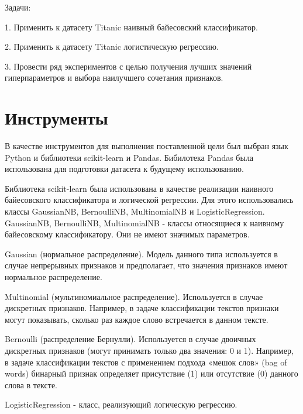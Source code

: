 \documentclass[a4paper,12pt]{article}
\begin{document}
	\vspace{0.5cm}
	Задачи: 
	
	\vspace{0.5cm}
	1. Применить к датасету Titanic наивный байесовский классификатор.
	
	\vspace{0.5cm}
	2. Применить к датасету Titanic логистическую регрессию.

	\vspace{0.5cm}
	3. Провести ряд экспериментов с целью получения лучших значений гиперпараметров и выбора наилучшего сочетания признаков.
	
\newpage\section{Инструменты} 
	В качестве инструментов для выполнения поставленной цели был выбран язык Python и библиотеки scikit-learn и Pandas.
	Бибилотека Pandas была использована для подготовки датасета к будущему использованию.
	
	\vspace{0.5cm}
	Библиотека scikit-learn была использована  в качестве реализации наивного байесовского классификатора и логической регрессии. Для этого использовались классы GaussianNB, BernoulliNB, MultinomialNB и LogisticRegression. GaussianNB, BernoulliNB, MultinomialNB - классы относящиеся к наивному байесовскому классификатору. Они не имеют значимых параметров.
	
	\vspace{0.5cm}
	Gaussian (нормальное распределение). Модель данного типа используется в случае непрерывных признаков и предполагает, что значения признаков имеют нормальное распределение.
	
	\vspace{0.5cm}
	Multinomial (мультиномиальное распределение). Используется в случае дискретных признаков. Например, в задаче классификации текстов признаки могут показывать, сколько раз каждое слово встречается в данном тексте.
	
	\vspace{0.5cm}
	Bernoulli (распределение Бернулли). Используется в случае двоичных дискретных признаков (могут принимать только два значения: 0 и 1). Например, в задаче классификации текстов с применением подхода «мешок слов» (bag of words) бинарный признак определяет присутствие (1) или отсутствие (0) данного слова в тексте.
	
	\vspace{0.5cm}
	LogisticRegression - класс, реализующий логическую регрессию.
	
\end{document}
